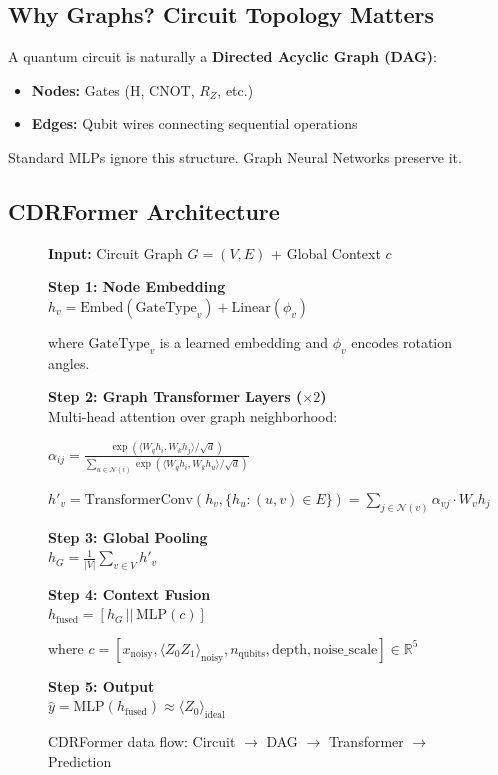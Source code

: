 \documentclass[11pt, a4paper]{article}
\begin{document}
\subsection{Why Graphs? Circuit Topology Matters}

A quantum circuit is naturally a \textbf{Directed Acyclic Graph (DAG)}:
\begin{itemize}
    \item \textbf{Nodes:} Gates (H, CNOT, $R_Z$, etc.)
    \item \textbf{Edges:} Qubit wires connecting sequential operations
\end{itemize}

Standard MLPs ignore this structure. Graph Neural Networks preserve it.

\subsection{CDRFormer Architecture}

\begin{figure}[H]
\centering
\begin{tcolorbox}[width=0.9\textwidth]
\textbf{Input:} Circuit Graph $G = (V, E)$ + Global Context $c$

\vspace{0.3cm}
\textbf{Step 1: Node Embedding} \\
$h_v = \text{Embed}(\text{GateType}_v) + \text{Linear}(\phi_v)$

where $\text{GateType}_v$ is a learned embedding and $\phi_v$ encodes rotation angles.

\vspace{0.3cm}
\textbf{Step 2: Graph Transformer Layers ($\times 2$)} \\
Multi-head attention over graph neighborhood:

$\alpha_{ij} = \frac{\exp(\langle W_q h_i, W_k h_j \rangle / \sqrt{d})}{\sum_{u \in \mathcal{N}(i)} \exp(\langle W_q h_i, W_k h_u \rangle / \sqrt{d})}$

$h'_v = \text{TransformerConv}(h_v, \{h_u : (u,v) \in E\})
= \sum_{j \in \mathcal{N}(v)} \alpha_{vj} \cdot W_v h_j$

\vspace{0.3cm}
\textbf{Step 3: Global Pooling} \\
$h_G = \frac{1}{|V|} \sum_{v \in V} h'_v$

\vspace{0.3cm}
\textbf{Step 4: Context Fusion} \\
$h_{\text{fused}} = [h_G \, || \, \text{MLP}(c)]$

where $c = [x_{\text{noisy}}, \langle Z_0 Z_1 \rangle_{\text{noisy}}, n_{\text{qubits}}, \text{depth}, \text{noise\_scale}] \in \mathbb{R}^5$

\vspace{0.3cm}
\textbf{Step 5: Output} \\
$\hat{y} = \text{MLP}(h_{\text{fused}}) \approx \langle Z_0 \rangle_{\text{ideal}}$
\end{tcolorbox}
\caption{CDRFormer data flow: Circuit $\rightarrow$ DAG $\rightarrow$ Transformer $\rightarrow$ Prediction}
\label{fig:architecture_flow}
\end{figure}
\end{document}
